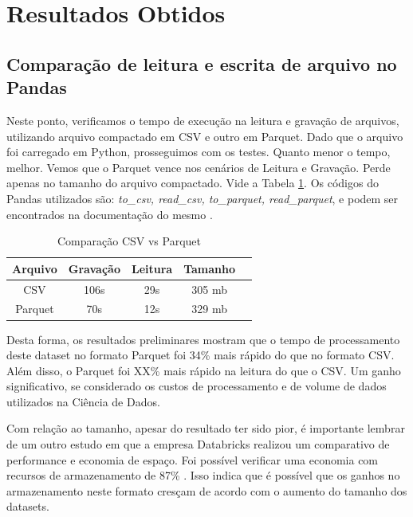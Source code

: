 \section{Resultados Obtidos}

\subsection{Comparação de leitura e escrita de arquivo no Pandas}

Neste ponto, verificamos o tempo de execução na leitura e gravação de arquivos, utilizando arquivo compactado em CSV e outro em Parquet. Dado que o arquivo foi carregado em Python, prosseguimos com os testes. Quanto menor o tempo, melhor. Vemos que o Parquet vence nos cenários de Leitura e Gravação. Perde apenas no tamanho do arquivo compactado. Vide a Tabela \ref{tab1}. Os códigos do Pandas utilizados são: \textit{to\_csv, read\_csv, to\_parquet, read\_parquet}, e podem ser encontrados na documentação do mesmo \cite{PandasDocumentation}.

\begin{table}[htbp]
	\caption{Comparação CSV vs Parquet}
	\begin{center}
		\begin{tabular}{|c|c|c|c|c|}
			\hline
			\textbf{Arquivo} & \textbf{Gravação} & \textbf{Leitura} & \textbf{Tamanho} \\
			\hline
			CSV              & 106s                & 29s              & 305 mb           \\
			\hline
			Parquet          & 70s                 & 12s              & 329 mb           \\
			\hline
		\end{tabular}
		\label{tab1}
	\end{center}
\end{table}


Desta forma, os resultados preliminares mostram que o tempo de processamento deste dataset no formato Parquet foi 34\% mais rápido do que no formato CSV. Além disso, o Parquet foi XX\% mais rápido na leitura do que o CSV. Um ganho significativo, se considerado os custos de processamento e de volume de dados utilizados na Ciência de Dados.

Com relação ao tamanho, apesar do resultado ter sido pior, é importante lembrar de um outro estudo em que a empresa Databricks realizou um comparativo de performance e economia de espaço. Foi possível verificar uma economia com recursos de armazenamento de 87\% \cite{Databricks}. Isso indica que é possível que os ganhos no armazenamento neste formato cresçam de acordo com o aumento do tamanho dos datasets.
	
